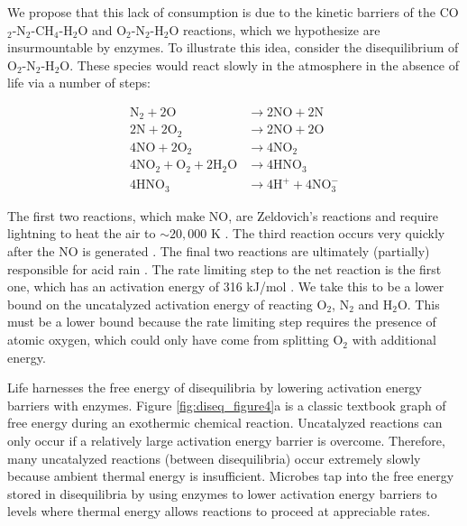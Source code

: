 We propose that this lack of consumption is due to the kinetic barriers of the CO$_2$-N$_2$-CH$_4$-H$_2$O and O$_2$-N$_2$-H$_2$O reactions, which we hypothesize are insurmountable by enzymes. To illustrate this idea, consider the disequilibrium of O$_2$-N$_2$-H$_2$O. These species would react slowly in the atmosphere in the absence of life via a number of steps:

\begin{equation}
\begin{aligned}
  \mathrm{N_2} + 2 \mathrm{O} &\rightarrow 2 \mathrm{NO} + 2 \mathrm{N} \\
  2 \mathrm{N} + 2 \mathrm{O_2} &\rightarrow 2 \mathrm{NO} + 2 \mathrm{O} \\
  4 \mathrm{NO} + 2 \mathrm{O_2} &\rightarrow 4 \mathrm{NO_2} \\
  4 \mathrm{NO_2} + \mathrm{O_2} + 2 \mathrm{H_2O} &\rightarrow 4 \mathrm{HNO_3} \\
  4 \mathrm{HNO_3} &\rightarrow 4 \mathrm{H^{+}} + 4 \mathrm{NO_3^{-}}
\end{aligned}
\end{equation}

The first two reactions, which make NO, are Zeldovich's reactions \citep{Dixon_1984} and require lightning to heat the air to $\sim 20,000$ K \citep{Chameides_1977}. The third reaction occurs very quickly after the NO is generated \citep{Murray_2016}. The final two reactions are ultimately (partially) responsible for acid rain \citep{Platt_1986}. The rate limiting step to the net reaction is the first one, which has an activation energy of 316 kJ/mol \citep{Dixon_1984}. We take this to be a lower bound on the uncatalyzed activation energy of reacting O$_2$, N$_2$ and H$_2$O. This must be a lower bound because the rate limiting step requires the presence of atomic oxygen, which could only have come from splitting O$_2$ with additional energy.

Life harnesses the free energy of disequilibria by lowering activation energy barriers with enzymes. Figure \ref{fig:diseq_figure4}a is a classic textbook graph of free energy during an exothermic chemical reaction. Uncatalyzed reactions can only occur if a relatively large activation energy barrier is overcome. Therefore, many uncatalyzed reactions (between disequilibria) occur extremely slowly because ambient thermal energy is insufficient. Microbes tap into the free energy stored in disequilibria by using enzymes to lower activation energy barriers to levels where thermal energy allows reactions to proceed at appreciable rates. 

